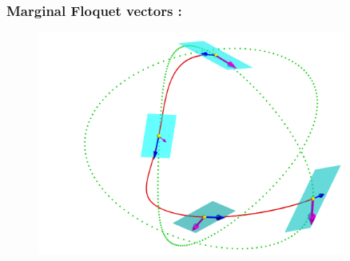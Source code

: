 \documentclass[mathserif, handout]{beamer}
\begin{document}
\begin{frame}
  \frametitle{Marginal Floquet vectors : }
    \begin{figure}[h]
    \centering
    \includegraphics[width=0.9\textwidth]{rpo1_marginal3}
  \end{figure}
\end{frame}
\end{document}
